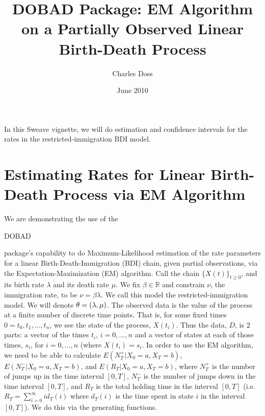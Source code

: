 \documentclass[12pt]{article}
\title{DOBAD Package: 
EM Algorithm on a Partially Observed Linear Birth-Death Process}
\author{Charles Doss}
\date{June 2010}
\def\R{\mathbb{R}}
\def\la{\lambda}
\begin{document}
\begin{titlepage}
\maketitle
\end{titlepage}


\vspace{-3.7mm} 





In this Sweave vignette, we will do estimation and confidence
intervals for the rates in the restricted-immigration BDI model.

\part{Estimating Rates for Linear Birth-Death Process via EM Algorithm}

We are demonstrating the use of the
\begin{verb}
DOBAD
\end{verb}
package's capability to do Maximum-Likelihood estimation of the rate
parameters for a linear Birth-Death-Immigration (BDI) chain, given
partial observations, via the Expectation-Maximization (EM) algorithm.
Call the chain $\{X(t)\}_{t \ge 0}$, and its birth rate $\la$ and its
death rate $\mu$.  We fix $\beta \in \R$ and constrain $\nu$, the
immigration rate, to be $\nu=\beta \la$.  We call this model the
restricted-immigration model.  We will denote $\bold{\theta} = (\la,
\mu)$.  The observed data is the value of the process at a finite
number of discrete time points.  That is, for some fixed times $0=t_0,
t_1, \ldots, t_n$, we see the state of the process, $X(t_i)$.  Thus
the data, $D$, is $2$ parts: a vector of the times $t_i$, $i= 0,
\ldots, n$ and a vector of states at each of those times, $s_i$, for
$i=0, \ldots, n$ (where $X(t_i) = s_i$.  In order to use the EM
algorithm, we need to be able to calculate $E(N_T^+| X_0=a, X_T=b)$,
$E(N_T^-| X_0=a, X_T=b)$, and $E(R_T| X_0=a, X_T=b)$, where $N_T^+$ is
the number of jumps up in the time interval $[0,T]$, $N_T^-$ is the
number of jumps down in the time interval $[0,T]$, and $R_T$ is the
total holding time in the interval $[0,T]$ (i.e.  $R_T =
\sum_{i=0}^\infty id_T(i)$ where $d_T(i)$ is the time spent in state
$i$ in the interval $[0,T]$).  We do this via the generating functions.
\end{document}
